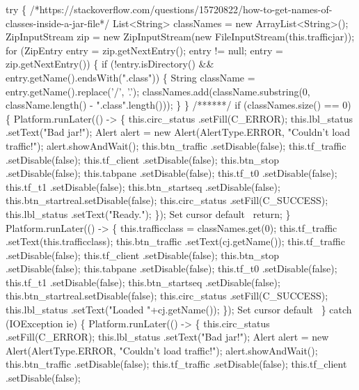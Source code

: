     try \{
/*https://stackoverflow.com/questions/15720822/how-to-get-names-of-classes-inside-a-jar-file*/
List<String> classNames = new ArrayList<String>();
ZipInputStream zip = new ZipInputStream(new FileInputStream(this.trafficjar));
for (ZipEntry entry = zip.getNextEntry(); entry != null; entry = zip.getNextEntry()) \{
  if (!entry.isDirectory() && entry.getName().endsWith(".class")) \{
    String className = entry.getName().replace('/', '.');
    classNames.add(className.substring(0, className.length() - ".class".length()));
  \}
\}
/******/
      if (classNames.size() == 0) \{
        Platform.runLater(() -> \{
          this.circ_status  .setFill(C_ERROR);
          this.lbl_status   .setText("Bad jar!");
          Alert alert = new Alert(AlertType.ERROR, "Couldn't load traffic!");
          alert.showAndWait();
          this.btn_traffic  .setDisable(false);
          this.tf_traffic   .setDisable(false);
          this.tf_client    .setDisable(false);
          this.btn_stop     .setDisable(false);
          this.tabpane      .setDisable(false);
          this.tf_t0        .setDisable(false);
          this.tf_t1        .setDisable(false);
          this.btn_startseq .setDisable(false);
          this.btn_startreal.setDisable(false);
          this.circ_status  .setFill(C_SUCCESS);
          this.lbl_status   .setText("Ready.");
        \});
        \LA{}Set cursor default~{\nwtagstyle{}}\RA{}
        return;
      \}
      Platform.runLater(() -> \{
        this.trafficclass = classNames.get(0);
        this.tf_traffic   .setText(this.trafficclass);
        this.btn_traffic  .setText(cj.getName());
        this.tf_traffic   .setDisable(false);
        this.tf_client    .setDisable(false);
        this.btn_stop     .setDisable(false);
        this.tabpane      .setDisable(false);
        this.tf_t0        .setDisable(false);
        this.tf_t1        .setDisable(false);
        this.btn_startseq .setDisable(false);
        this.btn_startreal.setDisable(false);
        this.circ_status  .setFill(C_SUCCESS);
        this.lbl_status   .setText("Loaded "+cj.getName());
      \});
      \LA{}Set cursor default~{\nwtagstyle{}}\RA{}
    \} catch (IOException ie) \{
      Platform.runLater(() -> \{
        this.circ_status  .setFill(C_ERROR);
        this.lbl_status   .setText("Bad jar!");
        Alert alert = new Alert(AlertType.ERROR, "Couldn't load traffic!");
        alert.showAndWait();
        this.btn_traffic  .setDisable(false);
        this.tf_traffic   .setDisable(false);
        this.tf_client    .setDisable(false);
